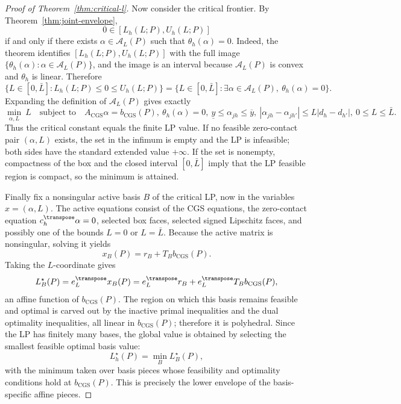 \begin{proof}[Proof of Theorem~\ref{thm:critical-l}]
Now consider the critical frontier.  By Theorem~\ref{thm:joint-envelope},
\[
  0\in[L_h(L;P),U_h(L;P)]
\]
if and only if there exists \(\alpha\in\mathcal A_L(P)\) such that
\(\theta_h(\alpha)=0\).  Indeed, the theorem identifies
\([L_h(L;P),U_h(L;P)]\) with the full image
\(\{\theta_h(\alpha):\alpha\in\mathcal A_L(P)\}\), and the image is an
interval because \(\mathcal A_L(P)\) is convex and \(\theta_h\) is linear.
Therefore
\[
  \{L\in[0,\bar L]:L_h(L;P)\le0\le U_h(L;P)\}
  =
  \{L\in[0,\bar L]:\exists\alpha\in\mathcal A_L(P),\
    \theta_h(\alpha)=0\}.
\]
Expanding the definition of \(\mathcal A_L(P)\) gives exactly
\[
 \min_{\alpha,L}\ L
 \quad\text{subject to}\quad
 A_{\mathrm{CGS}}\alpha=b_{\mathrm{CGS}}(P),\ 
 \theta_h(\alpha)=0,\ 
 \underline y\le\alpha_{jh}\le\overline y,\ 
 |\alpha_{j h}-\alpha_{j h'}|\le L|d_h-d_{h'}|,\ 
 0\le L\le\bar L .
\]
Thus the critical constant equals the finite LP value.  If no feasible
zero-contact pair \((\alpha,L)\) exists, the set in the infimum is empty and
the LP is infeasible; both sides have the standard extended value \(+\infty\).
If the set is nonempty, compactness of the box and the closed interval
\([0,\bar L]\) imply that the LP feasible region is compact, so the minimum is
attained.

Finally fix a nonsingular active basis \(B\) of the critical LP, now in the
variables \(x=(\alpha,L)\).  The active equations consist of the CGS equations,
the zero-contact equation \(c_h^\transpose\alpha=0\), selected box faces,
selected signed Lipschitz faces, and possibly one of the bounds \(L=0\) or
\(L=\bar L\).  Because the active matrix is nonsingular, solving it yields
\[
  x_B(P)=r_B+T_B b_{\mathrm{CGS}}(P).
\]
Taking the \(L\)-coordinate gives
\[
  L_B^\star(P)=e_L^\transpose x_B(P)
  =e_L^\transpose r_B+e_L^\transpose T_B b_{\mathrm{CGS}}(P),
\]
an affine function of \(b_{\mathrm{CGS}}(P)\).  The region on which this basis
remains feasible and optimal is carved out by the inactive primal inequalities
and the dual optimality inequalities, all linear in \(b_{\mathrm{CGS}}(P)\);
therefore it is polyhedral.  Since the LP has finitely many bases, the global
value is obtained by selecting the smallest feasible optimal basis value:
\[
  L_h^\star(P)=\min_{B} L_B^\star(P),
\]
with the minimum taken over basis pieces whose feasibility and optimality
conditions hold at \(b_{\mathrm{CGS}}(P)\).  This is precisely the lower
envelope of the basis-specific affine pieces.
\end{proof}

